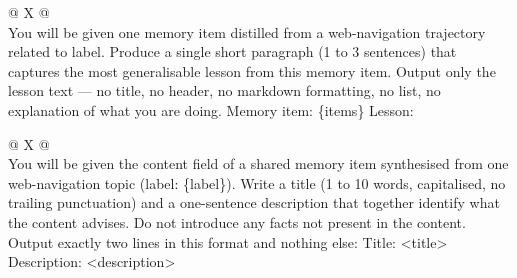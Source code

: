 \begin{table}[htbp]
    \centering
    \caption{Step 3 - System prompt used by the Gemma model to generate the differentially private content for each label bucket.}
    \label{tab:content-generation-prompt}
    \small
    \begin{tabularx}{\textwidth}{@{} X @{}}
        \toprule
         \\
        \midrule
        You will be given one memory item distilled from a web-navigation
        trajectory related to {label}. Produce a single short paragraph
        (1 to 3 sentences) that captures the most generalisable lesson
        from this memory item. Output only the lesson text — no title,
        no header, no markdown formatting, no list, no explanation of
        what you are doing.\newline
        \newline\newline
        Memory item:\newline
        \{items\}
        \newline\newline
        Lesson:
        \bottomrule
    \end{tabularx}
\end{table}

\begin{table}[htbp]
    \centering
    \caption{Step 4 - System prompt used by the Qwen model to generate a title and description for each synthesised shared-memory item.}
    \label{tab:titling-and-description-prompt}
    \small
    \begin{tabularx}{\textwidth}{@{} X @{}}
        \toprule
         \\
        \midrule
        You will be given the content field of a shared memory item synthesised from one web-navigation topic (label: \{label\}). Write a title (1 to 10 words, capitalised, no trailing punctuation) and a one-sentence description that together identify what the content advises. Do not introduce any facts not present in the content. Output exactly two lines in this format and nothing else:
        \newline\newline
        Title: \textless title\textgreater{}
        \newline
        Description: \textless description\textgreater{}
        \\
        \bottomrule
    \end{tabularx}
\end{table}

